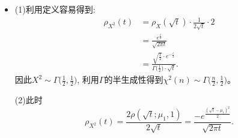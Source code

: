 \begin{itemize}
则\[D\phi = \begin{bmatrix}
1 & 1 \\ \\
\frac{1}{x_2} & -\frac{x_1}{x_2^2}
\end{bmatrix},\]
从而
\[|\det (D\phi^{-1})| = |-\frac{x_1+x_2}{x_2^2}|,\]
因此
\begin{align}
    \rho_{Y_1, Z_2}(y_1, z_2) &= \rho_{X_1, X_2}(\phi^{-1}(y_1, z_2)) \cdot |\det(D\phi^{-1})| \\
    &= \rho_{X_1, X_2}\left(\frac{z_2 y_1}{z_2+1}, \frac{y_1}{z_2+1}\right) \cdot \frac{y_1}{(z_2+1)^2} \\
    &= \rho_{X_1}\left(\frac{z_2 y_1}{z_2+1}\right) \cdot \rho_{X_2}\left(\frac{y_1}{z_2+1}\right) \cdot \frac{y_1}{(z_2+1)^2} \\
    &= \frac{\lambda^{\alpha_1}\big(\frac{z_2y_1}{z_2+1}\big)^{\alpha_1-1}}{\Gamma(\alpha_1)} 
    \cdot \frac{\lambda^{\alpha_2}\big(\frac{y_1}{z_2+1}\big)^{\alpha_2 - 1}}{\Gamma(\alpha_2)} 
    \cdot e^{\lambda y_1} \cdot \frac{y_1}{(z_2+1)^2}\\
    &= \frac{\lambda^{\alpha_1 + \alpha_2} \cdot y_1^{\alpha_1 + \alpha_2 - 1}\cdot e^{\lambda y_1}}{\Gamma{(\alpha_1)} \Gamma{(\alpha_2)}} 
    \cdot \frac{z_2^{\alpha_1 - 1}}{\Beta(\alpha_1, \alpha_2) \cdot (1+z_2)^{\alpha_1+ \alpha_2}}.
\end{align}

并且容易注意到:
\[\int_{\R} \frac{\lambda^{\alpha_1 + \alpha_2} \cdot y_1^{\alpha_1 + \alpha_2 - 1}\cdot e^{\lambda y_1}}{\Gamma{(\alpha_1)} \Gamma{(\alpha_2)}} \mathrm{d}y_1 = 1, \quad
\int_{\R} \frac{z_2^{\alpha_1 - 1}}{\Beta(\alpha_1, \alpha_2) \cdot (1+z_2)^{\alpha_1+ \alpha_2}} \mathrm{d} z_2= 1.\]

因此由引理可知$Y_1, Z_2$独立，并且$Z_2 \sim \operatorname{Beta}(\alpha_1, \alpha_2).$

\item[8.2]
(1)利用定义容易得到:
\begin{align}
    \rho_{X^2}(t) &= \rho_{X}(\sqrt{t}) \cdot \frac{1}{2\sqrt{t}} \cdot 2\\
&= \frac{e^{\frac{t}{2}}}{\sqrt{2\pi t}} \\
&= \frac{\sqrt{\frac12} \cdot e^{-\frac{t}{2}}}{\Gamma\big(\frac{1}{2}\big) \cdot \sqrt{t}}.
\end{align}
因此$X^2 \sim \Gamma\big(\frac12,\frac12\big)$,
利用$\Gamma$的半生成性得到$\chi^2(n) \sim \Gamma\big(\frac n2, \frac12\big)$。

(2)此时
\[\rho_{X^2}(t) = \frac{2\rho(\sqrt t; \mu_1, 1)}{2\sqrt t} 
= \frac{-e^{\frac{(\sqrt{t}-\mu_1)^2}{2}}}{\sqrt{2\pi t}}.\]
\end{itemize}



